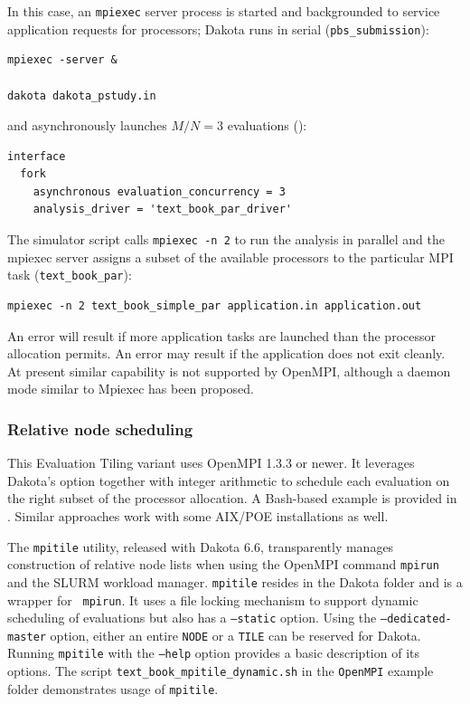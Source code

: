 In this case, an {\tt mpiexec} server process is started and
backgrounded to service application requests for processors; Dakota
runs in serial ({\tt pbs\_submission}):
\begin{verbatim}
mpiexec -server &

dakota dakota_pstudy.in
\end{verbatim}
and asynchronously launches $M/N=3$ evaluations ():
\begin{verbatim}
interface
  fork
    asynchronous evaluation_concurrency = 3
    analysis_driver = 'text_book_par_driver'
\end{verbatim}
The simulator script calls {\tt mpiexec -n 2} to run the analysis in
parallel and the mpiexec server assigns a subset of the available
processors to the particular MPI task ({\tt text\_book\_par}):
\begin{verbatim}
mpiexec -n 2 text_book_simple_par application.in application.out
\end{verbatim}
An error will result if more application tasks are launched than the
processor allocation permits.  An error may result if the application
does not exit cleanly.  At present similar capability is not supported
by OpenMPI, although a daemon mode similar to Mpiexec has been
proposed.

\subsubsection{Relative node scheduling}

This Evaluation Tiling variant uses OpenMPI 1.3.3 or newer.  It
leverages Dakota's  
option together with integer arithmetic to schedule each evaluation on
the right subset of the processor allocation.  A Bash-based example is
provided in .  Similar approaches
work with some AIX/POE installations as well.

The {\tt mpitile} utility, released with Dakota 6.6, transparently
manages construction of relative node lists when using the OpenMPI
command {\tt mpirun} and the SLURM workload manager. {\tt mpitile}
resides in the Dakota  folder and is a wrapper for {\tt
  mpirun}. It uses a file locking mechanism to support dynamic
scheduling of evaluations but also has a {\tt --static} option. Using
the {\tt --dedicated-master} option, either an entire {\tt NODE} or a
{\tt TILE} can be reserved for Dakota. Running {\tt mpitile} with the
{\tt --help} option provides a basic description of its options. The
script {\tt text\_book\_mpitile\_dynamic.sh} in the {\tt OpenMPI}
example folder demonstrates usage of {\tt mpitile}.
	
